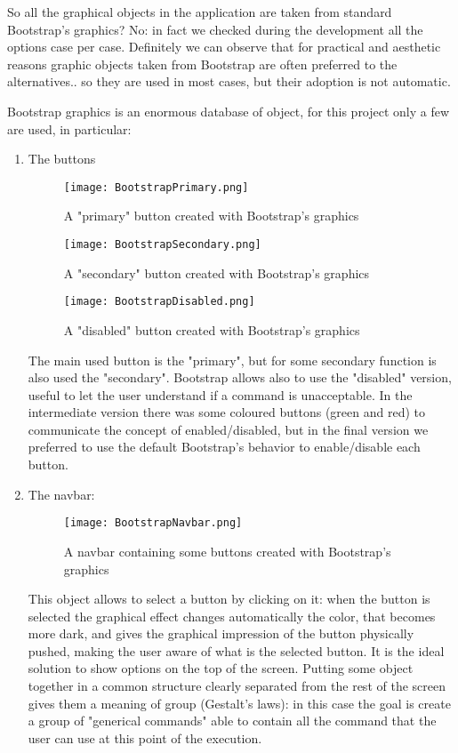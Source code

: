 So all the graphical objects in the application are taken from standard Bootstrap's graphics? No: in fact we checked during the development all the options case per case. Definitely we can observe that for practical and aesthetic reasons graphic objects taken from Bootstrap are often preferred to the alternatives.. so they are used in most cases, but their adoption is not automatic.  

Bootstrap graphics is an enormous database of object, for this project only a few are used, in particular:

\begin{enumerate}

\item The buttons

\begin{figure}[H]
\centering
\texttt{[image: BootstrapPrimary.png]} 
\caption{A "primary" button created with Bootstrap's graphics}
\end{figure}

\begin{figure}[H]
\centering
\texttt{[image: BootstrapSecondary.png]} 
\caption{A "secondary" button created with Bootstrap's graphics}
\end{figure}

\begin{figure}[H]
\centering
\texttt{[image: BootstrapDisabled.png]} 
\caption{A "disabled" button created with Bootstrap's graphics}
\end{figure}

The main used button is the "primary", but for some secondary function is also used the "secondary". Bootstrap allows also to use the "disabled" version, useful to let the user understand if a command is unacceptable. In the intermediate version there was some coloured buttons (green and red) to communicate the concept of enabled/disabled, but in the final version we preferred to use the default Bootstrap's behavior to enable/disable each button. 
 

\item The navbar:

\begin{figure}[H]
\centering
\texttt{[image: BootstrapNavbar.png]} 
\caption{A navbar containing some buttons created with Bootstrap's graphics}
\end{figure}

This object allows to select a button by clicking on it: when the button is selected the graphical effect changes automatically the color, that becomes more dark, and gives the graphical impression of the button physically pushed, making the user aware of what is the selected button. It is the ideal solution to show options on the top of the screen. 
Putting some object together in a common structure clearly separated from the rest of the screen gives them a meaning of group (Gestalt's laws): in this case the goal is create a group of "generical commands" able to contain all the command that the user can use at this point of the execution.  



\end{enumerate}

